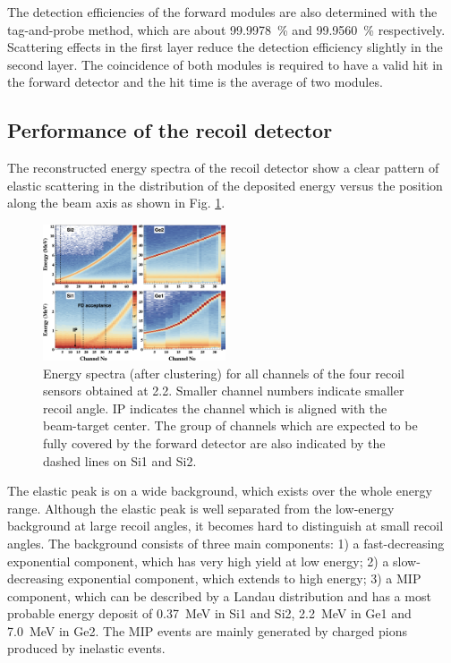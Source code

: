 \documentclass[number,5p]{elsarticle}
\begin{document}
The detection efficiencies of the forward modules are also determined with the
tag-and-probe method, which are about \SI{99.9978}{\percent} and \SI{99.9560}{\percent} respectively.
Scattering effects in the first layer reduce the detection efficiency slightly in the second layer.
The coincidence of both modules is required to have a valid hit in the
forward detector and the hit time is the average of two modules.

\subsection{Performance of the recoil detector}
\label{sec:recoil_performance}
The reconstructed energy spectra of the recoil detector show a clear pattern
of elastic scattering in the distribution of the deposited energy versus the
position along the beam axis as shown in Fig. \ref{fig:e_map}.
\begin{figure}[b!]
  \centering
  \includegraphics[width=0.48\textwidth]{./e_map.png}
  \caption{Energy spectra (after clustering) for all channels of the four recoil sensors obtained at \SI{2.2}{\momentum}.
    Smaller channel numbers indicate smaller recoil angle.
    IP indicates the channel which is aligned with
    the beam-target center.
    The group of channels which are expected to be fully covered by the forward detector are
    also indicated by the dashed lines on Si1 and Si2.
  }
  \label{fig:e_map}
\end{figure}
The elastic peak is on a wide background, which exists over the whole energy range.
Although the elastic peak is well separated from the low-energy background at
large recoil angles, it becomes hard to distinguish at small recoil angles.
The background consists of three main components:
1) a fast-decreasing exponential component, which has very high yield at low energy;
2) a slow-decreasing exponential component, which extends to high energy;
3) a MIP component, which can be described by a Landau distribution and has a most probable energy deposit of \SI{0.37}{\MeV} in Si1 and Si2, \SI{2.2}{\MeV} in Ge1 and \SI{7.0}{\MeV} in Ge2.
The MIP events are mainly generated by charged pions produced by inelastic events.
\end{document}
